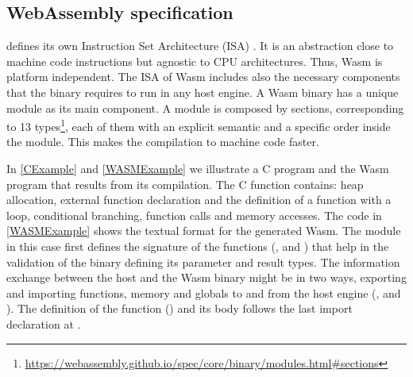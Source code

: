 
%







\subsection{WebAssembly specification}

\wasm defines its own Instruction Set Architecture (ISA) \cite{wasm_spec}. It is an abstraction close to machine code instructions but agnostic to CPU architectures. Thus, Wasm  is platform independent. The ISA of Wasm  includes also the necessary components that the binary requires to run in any host engine. 
A Wasm  binary has a unique module as its main component. A module is composed by sections, corresponding to 13 types\footnote{\url{https://webassembly.github.io/spec/core/binary/modules.html\#sections}}, each of them with an explicit semantic and a specific order inside the module. This makes the compilation to machine code faster. %


In \autoref{CExample} and \autoref{WASMExample} we illustrate a C program and the Wasm program that results from its compilation. The C function contains: heap allocation, external function declaration and the definition of a function with a loop, conditional branching, function calls and memory accesses. The code in \autoref{WASMExample} shows the textual format for the generated Wasm. The module in this case first defines the signature of the functions (,   and  )  that help in the validation of the binary defining its parameter and result types. The information exchange between the host and the Wasm  binary might be in two ways, exporting and importing functions, memory and globals to and from the host engine (,  and ). The definition of the function () and its body follows the last import declaration at . 

